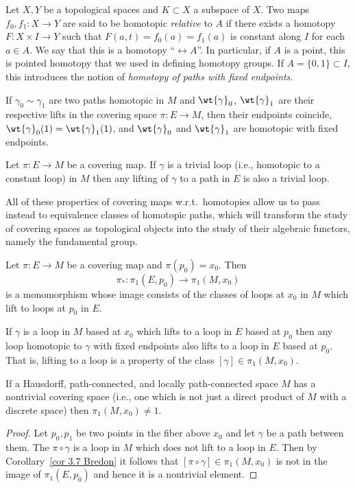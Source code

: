 \begin{defn}
    Let $X,Y$ be a topological spaces and $K\subset X$ a subspace of $X$. Two maps $f_0,f_1:X\to Y$ are said to be homotopic \emph{relative} to $A$ if there exists a homotopy $F:X\times I\to Y$ such that $F(a,t)=f_0(a)=f_1(a)$ is constant along $I$ for each $a\in A$. We say that this is a homotopy ``$\rel A$''. In particular, if $A$ is a point, this is pointed homotopy that we used in defining homotopy groups. If $A=\{0,1\}\subset I$, this introduces the notion of \emph{homotopy of paths with fixed endpoints}.
\end{defn}
\begin{cor}\label{cor 3.5 Bredon}
    If $\gamma_0\sim \gamma_1$ are two paths homotopic in $M$ and $\wt{\gamma}_0$, $\wt{\gamma}_1$ are their respective lifts in the covering space $\pi:E\to M$, then their endpoints coincide, $\wt{\gamma}_0(1)=\wt{\gamma}_1(1)$, and $\wt{\gamma}_0$ and $\wt{\gamma}_1$ are homotopic with fixed endpoints.
\end{cor}
\begin{cor}
    Let $\pi:E\to M$ be a covering map. If $\gamma$ is a trivial loop (i.e., homotopic to a constant loop) in $M$ then any lifting of $\gamma$ to a path in $E$ is also a trivial loop.
\end{cor}

All of these properties of covering maps w.r.t.\ homotopies allow us to pass instead to equivalence classes of homotopic paths, which will transform the study of covering spaces as topological objects into the study of their algebraic functors, namely the fundamental group. 
\begin{cor}\label{cor 3.7 Bredon}
    Let $\pi:E\to M$ be a covering map and $\pi(p_0)=x_0$. Then \[\pi_\ast : \pi_1(E,p_0)\to \pi_1(M,x_0)\] is a monomorphism whose image consists of the classes of loops at $x_0$ in $M$ which lift to loops at $p_0$ in $E$.
\end{cor}
\begin{cor}
    If $\gamma$ is a loop in $M$ based at $x_0$ which lifts to a loop in $E$ based at $p_0$ then any loop homotopic to $\gamma$ with fixed endpoints also lifts to a loop in $E$ based at $p_0$.  That is, lifting to a loop is a property of the class $[\gamma]\in\pi_1(M,x_0)$.
\end{cor}
\begin{cor}\label{cor 3.9 Bredon}
    If a Hausdorff, path-connected, and locally path-connected space $M$ has a nontrivial covering space (i.e., one which is not just a direct product of $M$ with a discrete space) then $\pi_1(M,x_0)\neq 1$.
\end{cor}
\begin{proof}
    Let $p_0,p_1$ be two points in the fiber above $x_0$ and let $\gamma $ be a path between them. The  $\pi\circ \gamma$ is a loop in $M$ which does not lift to a loop in $E$. Then  by Corollary~\ref{cor 3.7 Bredon} it follows that $[\pi\circ \gamma]\in\pi_1(M,x_0)$ is not in the image of $\pi_1(E,p_0)$ and hence it is a nontrivial element.
\end{proof}

